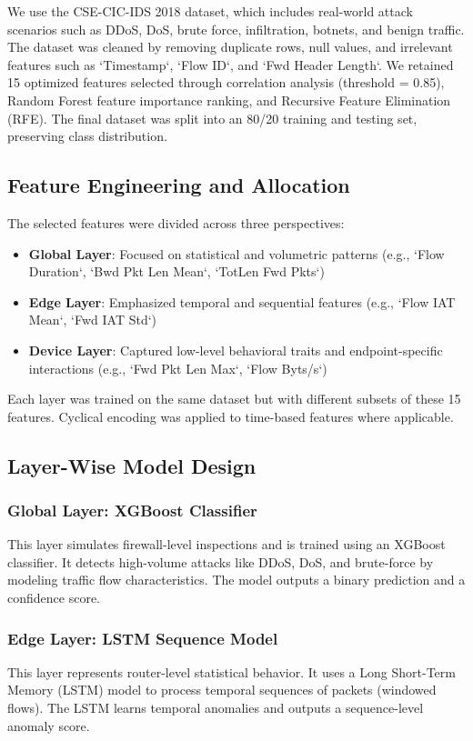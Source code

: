 \documentclass[conference]{IEEEtran}
\begin{document}
We use the CSE-CIC-IDS 2018 dataset, which includes real-world attack scenarios such as DDoS, DoS, brute force, infiltration, botnets, and benign traffic. The dataset was cleaned by removing duplicate rows, null values, and irrelevant features such as `Timestamp`, `Flow ID`, and `Fwd Header Length`. We retained 15 optimized features selected through correlation analysis (threshold = 0.85), Random Forest feature importance ranking, and Recursive Feature Elimination (RFE). The final dataset was split into an 80/20 training and testing set, preserving class distribution.

\subsection{Feature Engineering and Allocation}

The selected features were divided across three perspectives:
\begin{itemize}
    \item \textbf{Global Layer}: Focused on statistical and volumetric patterns (e.g., `Flow Duration`, `Bwd Pkt Len Mean`, `TotLen Fwd Pkts`)
    \item \textbf{Edge Layer}: Emphasized temporal and sequential features (e.g., `Flow IAT Mean`, `Fwd IAT Std`)
    \item \textbf{Device Layer}: Captured low-level behavioral traits and endpoint-specific interactions (e.g., `Fwd Pkt Len Max`, `Flow Byts/s`)
\end{itemize}

Each layer was trained on the same dataset but with different subsets of these 15 features. Cyclical encoding was applied to time-based features where applicable.

\subsection{Layer-Wise Model Design}

\subsubsection{Global Layer: XGBoost Classifier}
This layer simulates firewall-level inspections and is trained using an XGBoost classifier. It detects high-volume attacks like DDoS, DoS, and brute-force by modeling traffic flow characteristics. The model outputs a binary prediction and a confidence score.

\subsubsection{Edge Layer: LSTM Sequence Model}
This layer represents router-level statistical behavior. It uses a Long Short-Term Memory (LSTM) model to process temporal sequences of packets (windowed flows). The LSTM learns temporal anomalies and outputs a sequence-level anomaly score.
\end{document}
